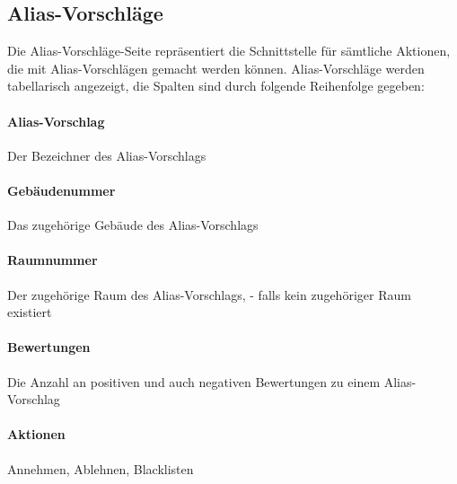 \subsection{Alias-Vorschläge}

Die Alias-Vorschläge-Seite repräsentiert die Schnittstelle für sämtliche Aktionen, die mit Alias-Vorschlägen gemacht werden können.
Alias-Vorschläge werden tabellarisch angezeigt, die Spalten sind durch folgende Reihenfolge gegeben:

\paragraph*{Alias-Vorschlag} 
    Der Bezeichner des Alias-Vorschlags
\paragraph*{Gebäudenummer} 
    Das zugehörige Gebäude des Alias-Vorschlags
\paragraph*{Raumnummer} 
    Der zugehörige Raum des Alias-Vorschlags, \dq - \dq{} falls kein zugehöriger Raum existiert
\paragraph*{Bewertungen}
    Die Anzahl an positiven und auch negativen Bewertungen zu einem Alias-Vorschlag
\paragraph*{Aktionen} 
    Annehmen, Ablehnen, Blacklisten
